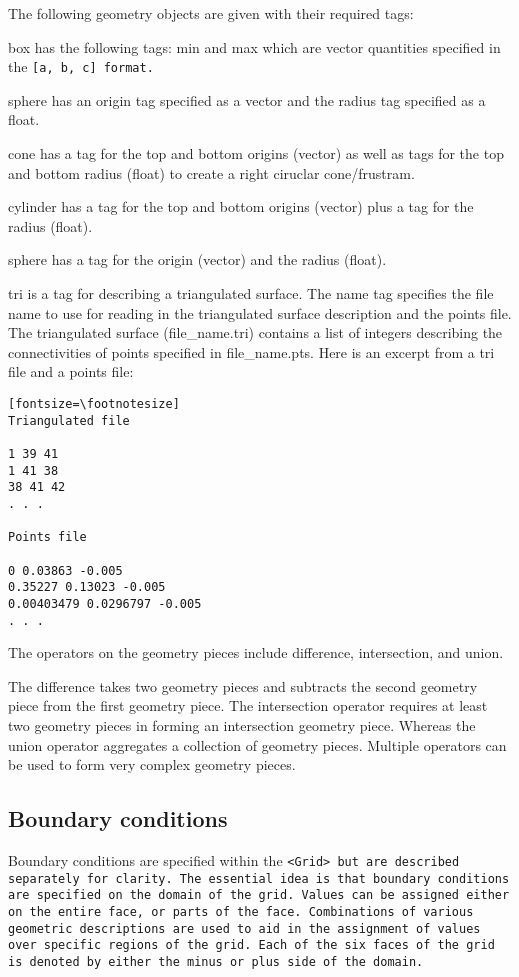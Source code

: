 The following geometry objects are given with their required tags:

box has the following tags: min and max which are vector quantities
specified in the \tt [a, b, c] \normalfont format.

sphere has an origin tag specified as a vector and the radius tag
specified as a float.

cone has a tag for the top and bottom origins (vector) as well as tags for the
top and bottom radius (float) to create a right ciruclar cone/frustram.

cylinder has a tag for the top and bottom origins (vector) plus a tag
for the radius (float).

sphere has a tag for the origin (vector) and the radius (float).

tri is a tag for describing a triangulated surface.  The name tag
specifies the file name to use for reading in the triangulated surface
description and the points file.  The triangulated surface
(file_name.tri) contains a list of integers describing the
connectivities of points specified in file_name.pts.  Here is an
excerpt from a tri file and a points file:


\begin{verbatim}[fontsize=\footnotesize]
Triangulated file

1 39 41
1 41 38
38 41 42   
. . .

Points file

0 0.03863 -0.005
0.35227 0.13023 -0.005
0.00403479 0.0296797 -0.005
. . . 

\end{verbatim}


The operators on the geometry pieces include difference, intersection,
and union.

The difference takes two geometry pieces and subtracts the second
geometry piece from the first geometry piece.  The intersection
operator requires at least two geometry pieces in forming an
intersection geometry piece.  Whereas the union operator aggregates a
collection of geometry pieces.  Multiple operators can be used to form
very complex geometry pieces.



\subsection{Boundary conditions}

Boundary conditions are specified within the \tt <Grid> \normalfont
but are described separately for clarity.  The essential idea is that
boundary conditions are specified on the domain of the grid.  Values
can be assigned either on the entire face, or parts of the face.
Combinations of various geometric descriptions are used to aid in the
assignment of values over specific regions of the grid.  Each of the
six faces of the grid is denoted by either the minus or plus side of
the domain. 

